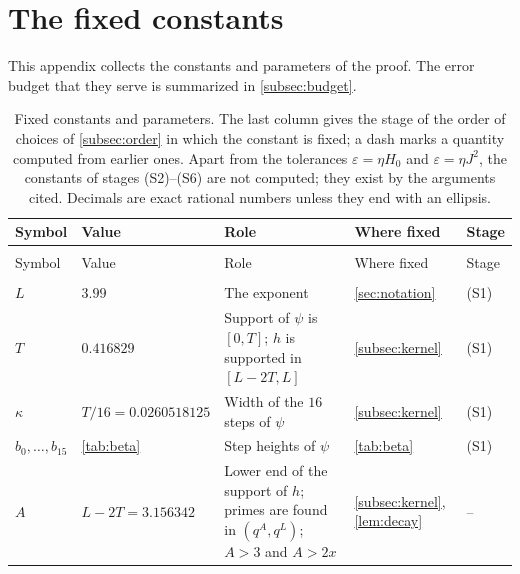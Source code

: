\documentclass[11pt]{amsart}
\numberwithin{equation}{section}
\theoremstyle{plain}
\theoremstyle{definition}
\theoremstyle{remark}
\newcommand{\eps}{\varepsilon}
\newcommand{\1}{\mathbf{1}}
\begin{document}
\section{The fixed constants}\label{app:constants}

This appendix collects the constants and parameters of the proof. The error budget that they
serve is summarized in \cref{subsec:budget}.

{\small
\setlength{\tabcolsep}{4pt}
\setlength{\LTcapwidth}{\linewidth}
\begin{longtable}{@{}>{\raggedright\arraybackslash}p{}
                  >{\raggedright\arraybackslash}p{}
                  >{\raggedright\arraybackslash}p{}
                  >{\raggedright\arraybackslash}p{}
                  >{\raggedright\arraybackslash}p{}@{}}
\caption{Fixed constants and parameters. The last column gives the stage of the order of
choices of \cref{subsec:order} in which the constant is fixed; a dash marks a quantity computed
from earlier ones. Apart from the tolerances $\eps=\eta H_0$ and $\eps=\eta J^2$, the constants
of stages (S2)--(S6) are not computed; they exist by the arguments cited. Decimals are exact
rational numbers unless they end with an ellipsis.}
\label{tab:constants}\\
\toprule
Symbol & Value & Role & Where fixed & Stage\\
\midrule
\endfirsthead
\multicolumn{5}{@{}l}{\emph{\cref{tab:constants}, continued}}\\
\toprule
Symbol & Value & Role & Where fixed & Stage\\
\midrule
\endhead
\bottomrule
\endlastfoot
\multicolumn{5}{@{}l}{\emph{Exponent and kernel}}\\
$L$ & $3.99$ & The exponent & \cref{sec:notation} & (S1)\\
$T$ & $0.416829$ & Support of $\psi$ is $[0,T]$; $h$ is supported in $[L-2T,L]$ & \cref{subsec:kernel} & (S1)\\
$\kappa$ & $T/16=0.0260518125$ & Width of the $16$ steps of $\psi$ & \cref{subsec:kernel} & (S1)\\
$b_0,\dots,b_{15}$ & \cref{tab:beta} & Step heights of $\psi$ & \cref{tab:beta} & (S1)\\
$A$ & $L-2T=3.156342$ & Lower end of the support of $h$; primes are found in $(q^A,q^L)$; $A>3$ and $A>2x$ & \cref{subsec:kernel}, \cref{lem:decay} & --\\

\end{longtable}}
\end{document}
